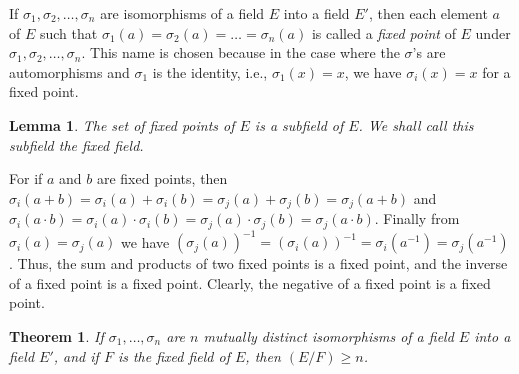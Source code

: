 \documentclass[11pt]{article}
\newtheorem{theo}{Theorem}
\newtheorem*{lemm}{Lemma}
\theoremstyle{definition}
\begin{document}
If $\sigma_1, \sigma_2, \ldots, \sigma_n$ are isomorphisms of a field $E$ into a field $E'$, then each element $a$ of $E$ such that $\sigma_1(a) = \sigma_2(a) = \ldots = \sigma_n(a)$ is called a \emph{fixed point} of $E$ under $\sigma_1, \sigma_2, \ldots, \sigma_n$.
This name is chosen because in the case where the $\sigma$'s are automorphisms and $\sigma_1$ is the identity, i.e., $\sigma_1(x) = x$, we have $\sigma_i(x) = x$ for a fixed point.


\begin{lemm}
The set of fixed points of $E$ is a subfield of $E$.
We shall call this subfield the fixed field.
\end{lemm}

For if $a$ and $b$ are fixed points, then $\sigma_i(a + b) = \sigma_i(a) + \sigma_i(b) = \sigma_j(a) + \sigma_j(b) = \sigma_j(a + b)$ and $\sigma_i(a \cdot b) = \sigma_i(a) \cdot \sigma_i(b) = \sigma_j(a) \cdot \sigma_j(b) = \sigma_j(a \cdot b)$.
Finally from $\sigma_i(a) = \sigma_j(a)$ we have $(\sigma_j(a))^{-1} = (\sigma_i(a))^{-1} = \sigma_i(a^{-1}) = \sigma_j(a^{-1})$.
Thus, the sum and products of two fixed points is a fixed point, and the inverse of a fixed point is a fixed point.
Clearly, the negative of a fixed point is a fixed point.


\begin{theo}
\label{theo:onth}
If $\sigma_1, \ldots, \sigma_n$ are $n$ mutually distinct isomorphisms of a field $E$ into a field $E'$, and if $F$ is the fixed field of $E$, then $(E/F) \geq n$.
\end{theo}
\end{document}
